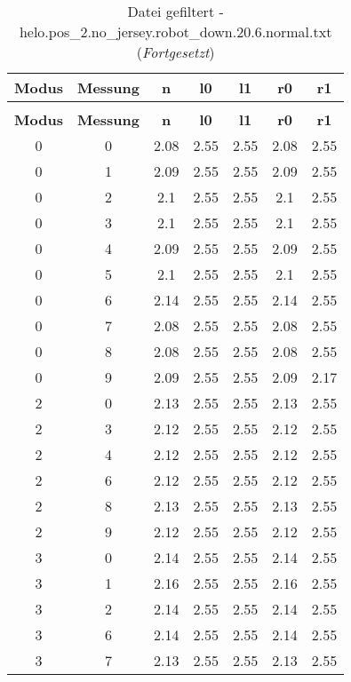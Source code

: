 \begin{longtable}{|c|c||c||c|c||c|c|}
	\caption{Datei gefiltert - helo.pos\_2.no\_jersey.robot\_down.20.6.normal.txt} \label{tab:helo.pos-2.no-jersey.robot-down.20.6.normal.txt} \\ \hline
	\textbf{Modus} & \textbf{Messung} & \textbf{n} & \textbf{l0} & \textbf{l1} & \textbf{r0} & \textbf{r1}\\ \hline
	\endfirsthead
	\caption[]{Datei gefiltert - helo.pos\_2.no\_jersey.robot\_down.20.6.normal.txt (\emph{Fortgesetzt})} \\ \hline
	\textbf{Modus} & \textbf{Messung} & \textbf{n} & \textbf{l0} & \textbf{l1} & \textbf{r0} & \textbf{r1}\\ \hline
	\endhead
	0 & 0 & 2.08 & 2.55 & 2.55 & 2.08 & 2.55 \\ \hline
	0 & 1 & 2.09 & 2.55 & 2.55 & 2.09 & 2.55 \\ \hline
	0 & 2 & 2.1 & 2.55 & 2.55 & 2.1 & 2.55 \\ \hline
	0 & 3 & 2.1 & 2.55 & 2.55 & 2.1 & 2.55 \\ \hline
	0 & 4 & 2.09 & 2.55 & 2.55 & 2.09 & 2.55 \\ \hline
	0 & 5 & 2.1 & 2.55 & 2.55 & 2.1 & 2.55 \\ \hline
	0 & 6 & 2.14 & 2.55 & 2.55 & 2.14 & 2.55 \\ \hline
	0 & 7 & 2.08 & 2.55 & 2.55 & 2.08 & 2.55 \\ \hline
	0 & 8 & 2.08 & 2.55 & 2.55 & 2.08 & 2.55 \\ \hline
	0 & 9 & 2.09 & 2.55 & 2.55 & 2.09 & 2.17 \\ \hline
	2 & 0 & 2.13 & 2.55 & 2.55 & 2.13 & 2.55 \\ \hline
	2 & 3 & 2.12 & 2.55 & 2.55 & 2.12 & 2.55 \\ \hline
	2 & 4 & 2.12 & 2.55 & 2.55 & 2.12 & 2.55 \\ \hline
	2 & 6 & 2.12 & 2.55 & 2.55 & 2.12 & 2.55 \\ \hline
	2 & 8 & 2.13 & 2.55 & 2.55 & 2.13 & 2.55 \\ \hline
	2 & 9 & 2.12 & 2.55 & 2.55 & 2.12 & 2.55 \\ \hline
	3 & 0 & 2.14 & 2.55 & 2.55 & 2.14 & 2.55 \\ \hline
	3 & 1 & 2.16 & 2.55 & 2.55 & 2.16 & 2.55 \\ \hline
	3 & 2 & 2.14 & 2.55 & 2.55 & 2.14 & 2.55 \\ \hline
	3 & 6 & 2.14 & 2.55 & 2.55 & 2.14 & 2.55 \\ \hline
	3 & 7 & 2.13 & 2.55 & 2.55 & 2.13 & 2.55 \\ \hline

\end{longtable}

